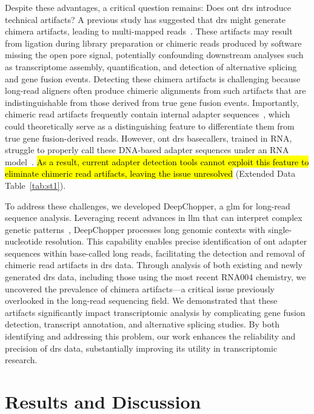 \documentclass[pdflatex,sn-nature, lineno]{sn-jnl}%
\newcommand{\edtableref}[2]{Extended Data Table~\hyperref[#1]{\ref*{#1}#2}}
\begin{document}
Despite these advantages, a critical question remains: Does \gls{ont} \gls{drs} introduce technical artifacts?
A previous study has suggested that \gls{drs} might generate chimera artifacts, leading to multi-mapped reads~\cite{smith2020molecular}.
These artifacts may result from ligation during library preparation or chimeric reads produced by software missing the open pore signal, potentially confounding downstream analyses such as transcriptome assembly, quantification, and detection of alternative splicing and gene fusion events.
Detecting these chimera artifacts is challenging because long-read aligners often produce chimeric alignments from such artifacts that are indistinguishable from those derived from true gene fusion events.
Importantly, chimeric read artifacts frequently contain internal adapter sequences~\cite{smith2020molecular}, which could theoretically serve as a distinguishing feature to differentiate them from true gene fusion-derived reads.
However, \gls{ont} \gls{drs} basecallers, trained in RNA, struggle to properly call these DNA-based adapter sequences under an RNA model~\cite{liu2024sequencing}.
\hl{As a result, current adapter detection tools cannot exploit this feature to eliminate chimeric read artifacts, leaving the issue unresolved} (\edtableref{tab:st1}{}).

To address these challenges, we developed DeepChopper, a \gls{glm} for long-read sequence analysis.
Leveraging recent advances in \gls{llm} that can interpret complex genetic patterns~\cite{benegas2024genomic}, DeepChopper processes long genomic contexts with single-nucleotide resolution.
This capability enables precise identification of \gls{ont} adapter sequences within base-called long reads, facilitating the detection and removal of chimeric read artifacts in \gls{drs} data.
Through analysis of both existing and newly generated \gls{drs} data, including those using the most recent RNA004 chemistry, we uncovered the prevalence of chimera artifacts—a critical issue previously overlooked in the long-read sequencing field.
We demonstrated that these artifacts significantly impact transcriptomic analysis by complicating gene fusion detection, transcript annotation, and alternative splicing studies.
By both identifying and addressing this problem, our work enhances the reliability and precision of \gls{drs} data, substantially improving its utility in transcriptomic research.

\section{Results and Discussion}
\end{document}
